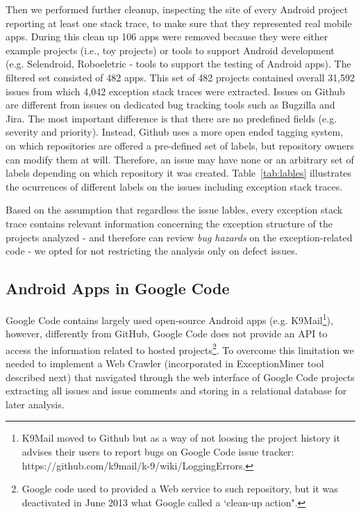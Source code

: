 \documentclass[conference]{IEEEtran}
\begin{document}
Then we performed further cleanup, inspecting the site of every Android project
reporting at least one stack trace, to make sure that they represented real
mobile apps. During this clean up 106 apps were removed because they were either
example projects (i.e., toy projects) or tools to support Android development
(e.g. Selendroid, Roboeletric - tools to support the testing of Android apps).
The filtered set consisted of 482 apps. This set of 482 projects contained overall 31,592 issues from which 4,042 exception stack traces 
were extracted. Issues on Github are different from issues on dedicated bug tracking tools such as 
Bugzilla and Jira. The most important difference is that there are no predefined fields
  (e.g. severity and priority). Instead, Github uses a more open ended tagging system, on which
repositories are offered a pre-defined set of labels, but repository owners can modify 
them at will. Therefore, an issue may have none or an arbitrary set of labels depending 
on which repository it was created. Table~\ref{tab:lables} illustrates the ocurrences of different labels 
on the issues including exception stack traces.

Based on the assumption that regardless the issue lables, every exception stack
trace contains relevant information concerning the exception structure of the
projects analyzed - and therefore can review \emph{bug hazards} on the exception-related code -  
we opted for not restricting the analysis only on defect issues.


\subsection{Android Apps in Google Code}
Google Code contains largely used open-source Android apps (e.g. K9Mail\footnote{K9Mail moved to Github but as a way of not loosing the project history it advises their users to report bugs on Google Code issue tracker: https://github.com/k9mail/k-9/wiki/LoggingErrors.}),
 however, differently from GitHub, Google Code does not provide an API to access the information related
 to hosted projects\footnote{Google code used to provided a Web service to such repository, but it was deactivated in June 2013 what Google called a `clean-up action".}.
To overcome this limitation we needed to implement a Web Crawler (incorporated in ExceptionMiner tool described next) that navigated 
through the web interface of Google Code projects extracting all issues and issue comments and storing in a relational database for later analysis.
\end{document}
